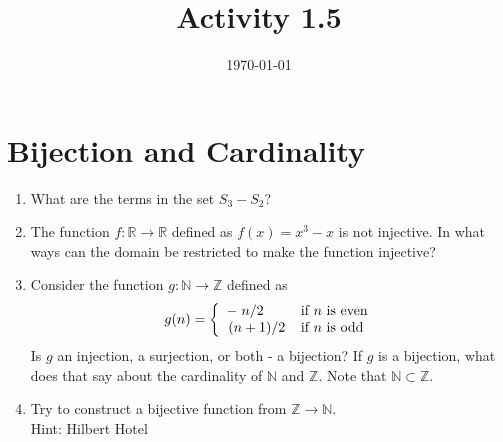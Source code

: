 \documentclass[12pt]{amsart}
\title{Activity 1.5}
\date{\today}
\begin{document}
\maketitle
\part*{Bijection and Cardinality}
\begin{enumerate}
\item What are the terms in the set $S_3 - S_2$?
\item The function $f: \mathbb{R} \to \mathbb{R}$ defined as $f(x) = x^3 - x$ is not injective. In what ways can the domain be restricted to make the function injective?
\item Consider the function $g: \mathbb{N} \to \mathbb{Z}$ defined as 
\begin{equation*}
g(n) = \left\{
    \begin{array}{ll}
        -\flatfrac{n}{2} & \text{if } n \text{ is even}\\
        \flatfrac{(n+1)}{2} & \text{if } n \text{ is odd}
    \end{array} 
    \right.
\end{equation*}
Is $g$ an injection, a surjection, or both - a bijection? If $g$ is a bijection, what does that say about the cardinality of $\mathbb{N}$ and $\mathbb{Z}$. Note that $\mathbb{N} \subset \mathbb{Z}$.
\item Try to construct a bijective function from $\mathbb{Z} \to \mathbb{N}$.\\
Hint: Hilbert Hotel
\end{enumerate}  
\end{document}
